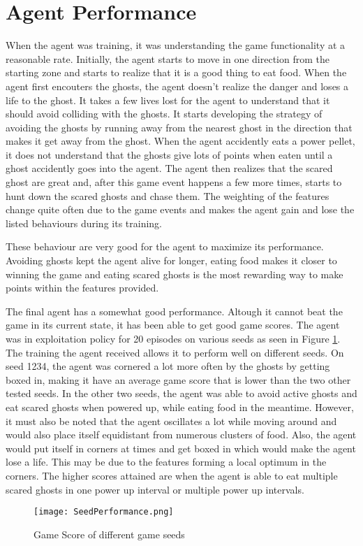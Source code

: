 \documentclass[11pt]{scrartcl}
\begin{document}
\section{Agent Performance}

When the agent was training, it was understanding the game functionality at a reasonable rate. Initially, the agent starts to move in one direction from the starting zone and starts to realize that it is a good thing to eat food. When the agent first encouters the ghosts, the agent doesn't realize the danger and loses a life to the ghost. It takes a few lives lost for the agent to understand that it should avoid colliding with the ghosts. It starts developing the strategy of avoiding the ghosts by running away from the nearest ghost in the direction that makes it get away from the ghost. When the agent accidently eats a power pellet, it does not understand that the ghosts give lots of points when eaten until a ghost accidently goes into the agent. The agent then realizes that the scared ghost are great and, after this game event happens a few more times, starts to hunt down the scared ghosts and chase them. The weighting of the features change quite often due to the game events and makes the agent gain and lose the listed behaviours during its training. 

These behaviour are very good for the agent to maximize its performance. Avoiding ghosts kept the agent alive for longer, eating food makes it closer to winning the game and eating scared ghosts is the most rewarding way to make points within the features provided.

The final agent has a somewhat good performance. Altough it cannot beat the game in its current state, it has been able to get good game scores. The agent was in exploitation policy for 20 episodes on various seeds as seen in Figure \ref{fig:F3}. The training the agent received allows it to perform well on different seeds. On seed 1234, the agent was cornered a lot more often by the ghosts by getting boxed in, making it have an average game score that is lower than the two other tested seeds. In the other two seeds, the agent was able to avoid active ghosts and eat scared ghosts when powered up, while eating food in the meantime. However, it must also be noted that the agent oscillates a lot while moving around and would also place itself equidistant from numerous clusters of food. Also, the agent would put itself in corners at times and get boxed in which would make the agent lose a life. This may be due to the features forming a local optimum in the corners. The higher scores attained are when the agent is able to eat multiple scared ghosts in one power up interval or multiple power up intervals.

\begin{figure}[ht]
\centering	
\texttt{[image: SeedPerformance.png]}	
\caption{Game Score of different game seeds}
\label{fig:F3}
\end{figure}


\end{document}

